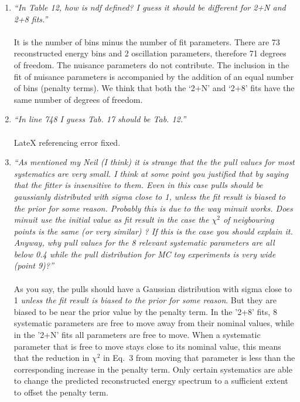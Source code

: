 \begin{enumerate}
\vspace{5 mm}
\item
{\em
  ``In Table 12, how is ndf defined? I guess it should be different for 2+N and 2+8 fits.''
}\\
\\
It is the number of bins minus the number of fit parameters.
There are 73 reconstructed energy bins and 2 oscillation parameters, therefore 71 degrees of freedom.
The nuisance parameters do not contribute.
The inclusion in the fit of nuisance parameters is accompanied by the addition of an equal number
of bins (penalty terms).
We think that both the `2+N' and `2+8' fits have the same number of degrees of freedom.

\vspace{5 mm}
\item
{\em
  ``In line 748 I guess Tab. 17 should be Tab. 12.''
}\\
\\
LateX referencing error fixed.

\vspace{5 mm}
\item
{\em
  ``As mentioned my Neil (I think) it is strange that the the pull values for most systematics are very small. 
    I think at some point you justified that by saying that the fitter is insensitive to them. 
    Even in this case pulls should be gaussianly distributed with sigma close to 1, unless the fit result 
    is biased to the prior for some reason. Probably this is due to the way minuit works. 
    Does minuit use the initial value as fit result in the case the $\chi^2$ of neigbouring points is the same 
    (or very similar) ? If this is the case you should explain it. 
    Anyway, why pull values for the 8 relevant systematic parameters are all below 0.4 while the 
    pull distribution for MC toy experiments is very wide (point 9)?''
}\\
\\
    As you say, the pulls should have a Gaussian distribution with sigma close to 1 \emph{unless the fit result
    is biased to the prior for some reason}. But they are biased to be near the prior value by the penalty 
    term. In the '2+8' fits, 8 systematic parameters are free to move away from their nominal values, while in 
    the '2+N' fits all parameters are free to move. When a systematic parameter that is free to move stays close 
    to its nominal value, this means that the reduction in $\chi^{2}$ in Eq.\ 3 from moving that parameter is 
    less than the corresponding increase in the penalty term. Only certain systematics are able to change the 
    predicted reconstructed energy spectrum to a sufficient extent to offset the penalty term. 


\end{enumerate}
